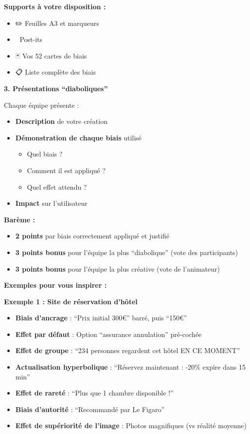 \documentclass[
]{article}
\providecommand{\tightlist}{%
  \setlength{\itemsep}{0pt}\setlength{\parskip}{0pt}}
\begin{document}
\textbf{Supports à votre disposition :}

\begin{itemize}
\tightlist
\item
  ✏️ Feuilles A3 et marqueurs
\item
  📝 Post-its
\item
  🃏 Vos 52 cartes de biais
\item
  📋 Liste complète des biais
\end{itemize}

\textbf{3. Présentations ``diaboliques''}

Chaque équipe présente :

\begin{itemize}
\tightlist
\item
  \textbf{Description} de votre création
\item
  \textbf{Démonstration de chaque biais} utilisé

  \begin{itemize}
  \tightlist
  \item
    Quel biais ?
  \item
    Comment il est appliqué ?
  \item
    Quel effet attendu ?
  \end{itemize}
\item
  \textbf{Impact} sur l'utilisateur
\end{itemize}

\textbf{Barème :}

\begin{itemize}
\tightlist
\item
  \textbf{2 points} par biais correctement appliqué et justifié
\item
  \textbf{3 points bonus} pour l'équipe la plus ``diabolique'' (vote des
  participants)
\item
  \textbf{3 points bonus} pour l'équipe la plus créative (vote de
  l'animateur)
\end{itemize}

\textbf{Exemples pour vous inspirer :}

\textbf{Exemple 1 : Site de réservation d'hôtel}

\begin{itemize}
\tightlist
\item
  \textbf{Biais d'ancrage} : ``Prix initial 300€'' barré, puis ``150€''
\item
  \textbf{Effet par défaut} : Option ``assurance annulation'' pré-cochée
\item
  \textbf{Effet de groupe} : ``234 personnes regardent cet hôtel EN CE
  MOMENT''
\item
  \textbf{Actualisation hyperbolique} : ``Réservez maintenant : -20\%
  expire dans 15 min''
\item
  \textbf{Effet de rareté} : ``Plus que 1 chambre disponible !''
\item
  \textbf{Biais d'autorité} : ``Recommandé par Le Figaro''
\item
  \textbf{Effet de supériorité de l'image} : Photos magnifiques (vs
  réalité moyenne)
\end{itemize}
\end{document}
